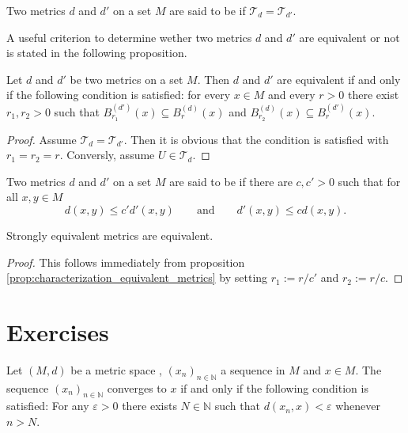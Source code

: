 \begin{definition}
	Two metrics $d$ and $d'$ on a set $M$ are said to be  if $\mathcal{T}_d = \mathcal{T}_{d'}$.
\end{definition}

A useful criterion to determine wether two metrics $d$ and $d'$ are equivalent or not is stated in the following proposition.

\begin{proposition}
	Let $d$ and $d'$ be two metrics on a set $M$. Then $d$ and $d'$ are equivalent if and only if the following condition is satisfied: for every $x \in M$ and every $r > 0$ there exist $r_1,r_2 > 0$ such that $B_{r_1}^{(d')}(x) \subseteq B_r^{(d)}(x)$ and $B_{r_2}^{(d)}(x) \subseteq B_r^{(d')}(x)$. 
	\label{prop:characterization_equivalent_metrics}
\end{proposition}

\begin{proof}
	Assume $\mathcal{T}_d = \mathcal{T}_{d'}$. Then it is obvious that the condition is satisfied with $r_1 = r_2 = r$. Conversly, assume $U \in \mathcal{T}_d$.	
\end{proof}

\begin{definition}
	Two metrics $d$ and $d'$ on a set $M$ are said to be  if there are $c, c' > 0$ such that for all $x,y \in M$ 
	\begin{equation}
		d(x,y) \leq c' d'(x,y) \qquad \text{and} \qquad d'(x,y) \leq c d(x,y).
	\end{equation}
\end{definition}

\begin{corollary}
	Strongly equivalent metrics are equivalent.
\end{corollary}

\begin{proof}
	This follows immediately from proposition \ref{prop:characterization_equivalent_metrics} by setting $r_1 := r/c'$ and $r_2 := r/c$.
\end{proof}

\section*{Exercises}

\begin{exercise}
	Let $(M,d)$ be a metric space , $(x_n)_{n \in \mathbb{N}}$ a sequence in $M$ and $x \in M$. The sequence $(x_n)_{n \in \mathbb{N}}$ converges to $x$ if and only if the following condition is satisfied: For any $\varepsilon > 0$ there exists $N \in \mathbb{N}$ such that $d(x_n,x) < \varepsilon$ whenever $n > N$.
	\label{ex:metric_convergence}
\end{exercise}

